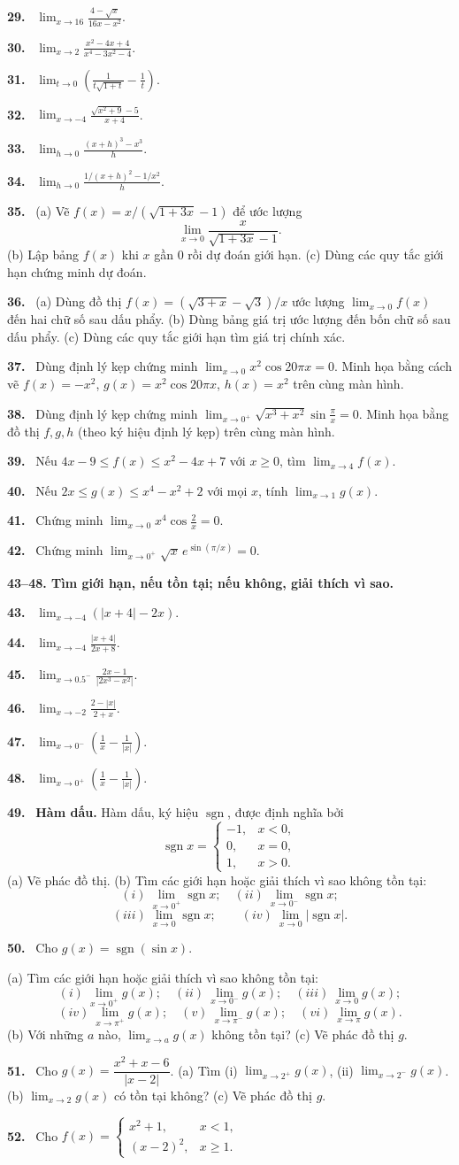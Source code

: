 \documentclass[12pt,a4paper]{article}
\newcommand{\bt}[1]{\par\smallskip\noindent\textbf{#1.}\ }
\newcommand{\group}[1]{\par\medskip\noindent\textbf{#1}\par}
\begin{document}
\bt{29} $\displaystyle\lim_{x\to16}\frac{4-\sqrt{x}}{16x-x^2}$.
\bt{30} $\displaystyle\lim_{x\to2}\frac{x^2-4x+4}{x^4-3x^2-4}$.
\bt{31} $\displaystyle\lim_{t\to0}\left(\frac1{t\sqrt{1+t}}-\frac1t\right)$.
\bt{32} $\displaystyle\lim_{x\to-4}\frac{\sqrt{x^2+9}-5}{x+4}$.
\bt{33} $\displaystyle\lim_{h\to0}\frac{(x+h)^3-x^3}{h}$.
\bt{34} $\displaystyle\lim_{h\to0}\frac{1/(x+h)^2-1/x^2}{h}$.
\bt{35} (a) Vẽ $f(x)=x/(\sqrt{1+3x}-1)$ để ước lượng
\[\lim_{x\to0}\frac{x}{\sqrt{1+3x}-1}.\]
(b) Lập bảng $f(x)$ khi $x$ gần 0 rồi dự đoán giới hạn. (c) Dùng các quy tắc giới hạn chứng minh dự đoán.
\bt{36} (a) Dùng đồ thị $f(x)=(\sqrt{3+x}-\sqrt3)/x$ ước lượng $\lim_{x\to0}f(x)$ đến hai chữ số sau dấu phẩy. (b) Dùng bảng giá trị ước lượng đến bốn chữ số sau dấu phẩy. (c) Dùng các quy tắc giới hạn tìm giá trị chính xác.
\bt{37} Dùng định lý kẹp chứng minh $\lim_{x\to0}x^2\cos20\pi x=0$. Minh họa bằng cách vẽ $f(x)=-x^2$, $g(x)=x^2\cos20\pi x$, $h(x)=x^2$ trên cùng màn hình.
\bt{38} Dùng định lý kẹp chứng minh $\displaystyle\lim_{x\to0^+}\sqrt{x^3+x^2}\sin\frac\pi x=0$. Minh họa bằng đồ thị $f,g,h$ (theo ký hiệu định lý kẹp) trên cùng màn hình.
\bt{39} Nếu $4x-9\le f(x)\le x^2-4x+7$ với $x\ge0$, tìm $\lim_{x\to4}f(x)$.
\bt{40} Nếu $2x\le g(x)\le x^4-x^2+2$ với mọi $x$, tính $\lim_{x\to1}g(x)$.
\bt{41} Chứng minh $\displaystyle\lim_{x\to0}x^4\cos\frac2x=0$.
\bt{42} Chứng minh $\displaystyle\lim_{x\to0^+}\sqrt{x}\,e^{\sin(\pi/x)}=0$.
\group{43–48. Tìm giới hạn, nếu tồn tại; nếu không, giải thích vì sao.}
\bt{43} $\displaystyle\lim_{x\to-4}(|x+4|-2x)$.
\bt{44} $\displaystyle\lim_{x\to-4}\frac{|x+4|}{2x+8}$.
\bt{45} $\displaystyle\lim_{x\to0.5^-}\frac{2x-1}{|2x^3-x^2|}$.
\bt{46} $\displaystyle\lim_{x\to-2}\frac{2-|x|}{2+x}$.
\bt{47} $\displaystyle\lim_{x\to0^-}\left(\frac1x-\frac1{|x|}\right)$.
\bt{48} $\displaystyle\lim_{x\to0^+}\left(\frac1x-\frac1{|x|}\right)$.
\bt{49} \textbf{Hàm dấu.} Hàm dấu, ký hiệu $\operatorname{sgn}$, được định nghĩa bởi
\[\operatorname{sgn}x=\begin{cases}-1,&x<0,\\0,&x=0,\\1,&x>0.\end{cases}\]
(a) Vẽ phác đồ thị. (b) Tìm các giới hạn hoặc giải thích vì sao không tồn tại:
\[(i)\ \lim_{x\to0^+}\operatorname{sgn}x;\quad(ii)\ \lim_{x\to0^-}\operatorname{sgn}x;\]
\[(iii)\ \lim_{x\to0}\operatorname{sgn}x;\qquad(iv)\ \lim_{x\to0}|\operatorname{sgn}x|.\]
\bt{50} Cho $g(x)=\operatorname{sgn}(\sin x)$.

(a) Tìm các giới hạn hoặc giải thích vì sao không tồn tại:
\[(i)\ \lim_{x\to0^+}g(x);\quad(ii)\ \lim_{x\to0^-}g(x);\quad(iii)\ \lim_{x\to0}g(x);\]
\[(iv)\ \lim_{x\to\pi^+}g(x);\quad(v)\ \lim_{x\to\pi^-}g(x);\quad(vi)\ \lim_{x\to\pi}g(x).\]
(b) Với những $a$ nào, $\lim_{x\to a}g(x)$ không tồn tại? (c) Vẽ phác đồ thị $g$.
\bt{51} Cho $g(x)=\dfrac{x^2+x-6}{|x-2|}$. (a) Tìm (i) $\lim_{x\to2^+}g(x)$, (ii) $\lim_{x\to2^-}g(x)$. (b) $\lim_{x\to2}g(x)$ có tồn tại không? (c) Vẽ phác đồ thị $g$.
\bt{52} Cho $f(x)=\begin{cases}x^2+1,&x<1,\\(x-2)^2,&x\ge1.\end{cases}$
\end{document}
